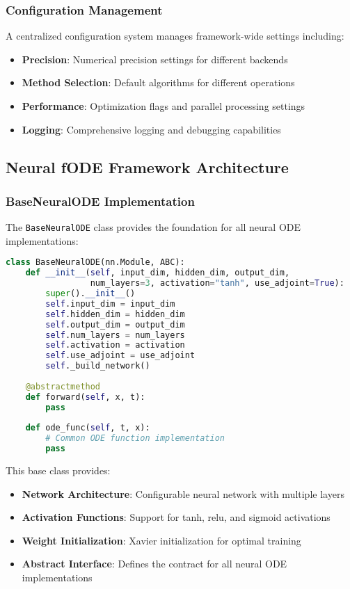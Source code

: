 \subsubsection{Configuration Management}

A centralized configuration system manages framework-wide settings including:

\begin{itemize}
    \item \textbf{Precision}: Numerical precision settings for different backends
    \item \textbf{Method Selection}: Default algorithms for different operations
    \item \textbf{Performance}: Optimization flags and parallel processing settings
    \item \textbf{Logging}: Comprehensive logging and debugging capabilities
\end{itemize}

\subsection{Neural fODE Framework Architecture}

\subsubsection{BaseNeuralODE Implementation}

The \texttt{BaseNeuralODE} class provides the foundation for all neural ODE implementations:

\begin{lstlisting}[language=Python, caption=BaseNeuralODE Base Class]
class BaseNeuralODE(nn.Module, ABC):
    def __init__(self, input_dim, hidden_dim, output_dim, 
                 num_layers=3, activation="tanh", use_adjoint=True):
        super().__init__()
        self.input_dim = input_dim
        self.hidden_dim = hidden_dim
        self.output_dim = output_dim
        self.num_layers = num_layers
        self.activation = activation
        self.use_adjoint = use_adjoint
        self._build_network()
    
    @abstractmethod
    def forward(self, x, t):
        pass
    
    def ode_func(self, t, x):
        # Common ODE function implementation
        pass
\end{lstlisting}

This base class provides:
\begin{itemize}
    \item \textbf{Network Architecture}: Configurable neural network with multiple layers
    \item \textbf{Activation Functions}: Support for tanh, relu, and sigmoid activations
    \item \textbf{Weight Initialization}: Xavier initialization for optimal training
    \item \textbf{Abstract Interface}: Defines the contract for all neural ODE implementations
\end{itemize}

